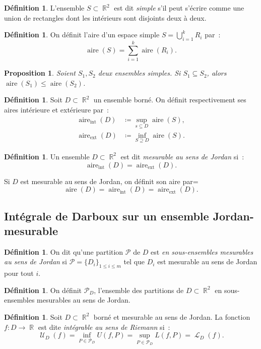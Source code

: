 \documentclass{article}
\DeclareMathOperator{\R}{\mathbb R}
\DeclareMathOperator{\Larea}{\mathcal L}
\DeclareMathOperator{\Uarea}{\mathcal U}
\DeclareMathOperator{\aire}{aire}
\newcommand{\aireint}{\aire_{\text{int}}}
\newcommand{\aireext}{\aire_{\text{ext}}}
\newtheorem{prp}[thm]{Proposition}
\theoremstyle{definition}
\newtheorem{déf}[thm]{Définition}
\theoremstyle{remark}
\begin{document}
		\begin{déf} L'ensemble $S \subset \R^2$ est dit \emph{simple} s'il peut s'écrire comme une union de rectangles dont les intérieurs sont disjoints deux
		à deux.
		\end{déf}

		\begin{déf} On définit l'aire d'un espace simple $S = \bigcup_{i=1}^kR_i$ par~:
		\[\aire(S) = \sum_{i=1}^k\aire(R_i).\]
		\end{déf}

		\begin{prp} Soient $S_1, S_2$ deux ensembles simples. Si $S_1 \subseteq S_2$, alors $\aire(S_1) \leq \aire(S_2)$.
		\end{prp}

		\begin{déf} Soit $D \subset \R^2$ un ensemble borné. On définit respectivement ses aires intérieure et extérieure par~:
		\begin{align*}
			\aireint(D) &\coloneqq \sup_{s \subseteq D}\aire(S), \\
			\aireext(D) &\coloneqq \inf_{S \supseteq D}\aire(S).
		\end{align*}
		\end{déf}

		\begin{déf} Un ensemble $D \subset \R^2$ est dit \emph{mesurable au sens de Jordan} si~:
		\[\aireint(D) =\aireext(D).\]

		Si $D$ est mesurable au sens de Jordan, on définit son aire par=
		\[\aire(D) = \aireint(D) = \aireext(D).\]
		\end{déf}

	\subsection{Intégrale de Darboux sur un ensemble Jordan-mesurable}
		\begin{déf} On dit qu'une partition $\mathcal P$ de $D$ est \emph{en sous-ensembles mesurables au sens de Jordan} si
		$\mathcal P = \{D_i\}_{1 \leq i \leq m}$ tel que $D_i$ est mesurable au sens de Jordan pour tout $i$.
		\end{déf}

		\begin{déf} On définit $\mathcal P_D$, l'ensemble des partitions de $D \subset \R^2$ en sous-ensembles mesurables au sens de Jordan.
		\end{déf}

		\begin{déf} Soit $D \subset \R^2$ borné et mesurable au sens de Jordan. La fonction $f : D \to \R$ est dite \emph{intégrable au sens de Riemann} si~:
		\[\Uarea_D(f) = \inf_{P \in \mathcal P_D}U(f, P) = \sup_{P \in \mathcal P_D}L(f, P) = \Larea_D(f).\]
		\end{déf}
\end{document}
